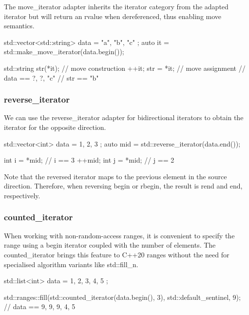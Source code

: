 The move\_iterator adapter inherits the iterator category from the adapted iterator but will return an rvalue when dereferenced, thus enabling move semantics.

\begin{box-note}
\begin{cppcode}
std::vector<std::string> data = { "a", "b", "c" };
auto it = std::make_move_iterator(data.begin());

std::string str(*it); // move construction
++it;
str = *it; // move assignment
// data == { ?, ?, "c" }
// str == "b"
\end{cppcode}
\end{box-note}

\subsubsection{reverse\_iterator}

We can use the reverse\_iterator adapter for bidirectional iterators to obtain the iterator for the opposite direction.

\begin{box-note}
\begin{cppcode}
std::vector<int> data = { 1, 2, 3 };
auto mid = std::reverse_iterator(data.end());

int i = *mid; // i == 3
++mid;
int j = *mid; // j == 2
\end{cppcode}
\end{box-note}

Note that the reversed iterator maps to the previous element in the source direction. Therefore, when reversing begin or rbegin, the result is rend and end, respectively.

\subsubsection{counted\_iterator}

When working with non-random-access ranges, it is convenient to specify the range using a begin iterator coupled with the number of elements. The counted\_iterator brings this feature to C++20 ranges without the need for specialised algorithm variants like std::fill\_n.

\begin{box-note}
\begin{cppcode}
std::list<int> data = { 1, 2, 3, 4, 5 };

std::ranges::fill(std::counted_iterator(data.begin(), 3), std::default_sentinel, 9);
// data == { 9, 9, 9, 4, 5 }
\end{cppcode}
\end{box-note}

